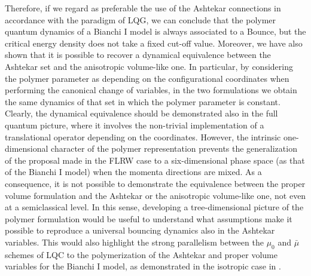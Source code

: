 \documentclass[aps,prd,twocolumn,nofootinbib,superscriptaddress]{revtex4-2}
\begin{document}
Therefore, if we regard as preferable the use of the Ashtekar connections in accordance with the paradigm of LQG, we can conclude that the polymer quantum dynamics of a Bianchi I model is always associated to a Bounce, but the  critical energy density does not take a fixed cut-off value. Moreover, we have also shown that it is possible to recover a dynamical equivalence between the Ashtekar set and the anisotropic volume-like one. In particular, by considering the polymer parameter as depending on the configurational coordinates when performing the canonical change of variables, in the two formulations we obtain the same dynamics of that set in which the polymer parameter is constant. Clearly, the dynamical equivalence should be demonstrated also in the full quantum picture, where it involves the non-trivial implementation of a translational operator depending on the coordinates. However, the intrinsic one-dimensional character of the polymer representation prevents the generalization of the proposal made in the FLRW case \cite{EFG} to a six-dimensional phase space (as that of the Bianchi I model) when the momenta directions are mixed. As a consequence, it is not possible to demonstrate the equivalence between the proper volume formulation and the Ashtekar or the anisotropic volume-like one, not even at a semiclassical level. In this sense, developing a tree-dimensional picture of the polymer formulation would be useful to understand what assumptions make it possible to reproduce a universal bouncing dynamics also in the Ashtekar variables. This would also highlight the strong parallelism between the $\mu_0$ and $\bar{\mu}$ schemes of LQC to the polymerization of the Ashtekar and proper volume variables for the Bianchi I model, as demonstrated in the isotropic case in \cite{EFG}.
\end{document}
